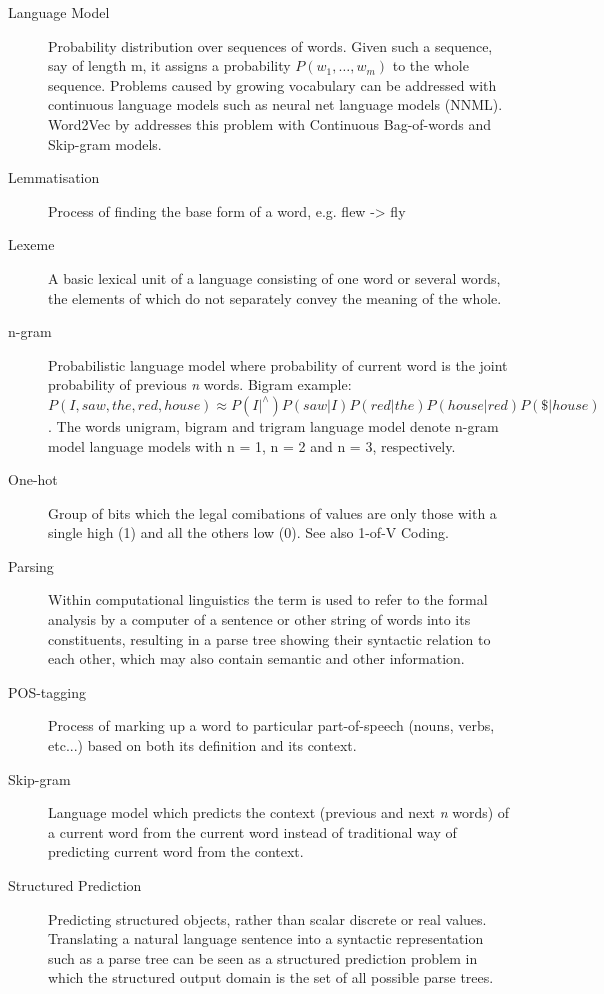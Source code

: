 \documentclass[12pt,a4paper,english
]{tutthesis}
\begin{document}
\begin{description}
\item[Language Model] Probability distribution over sequences of words. Given such a sequence, say of length m, it assigns a probability $P(w_{1},\ldots ,w_{m})$ to the whole sequence. Problems caused by growing vocabulary can be addressed with continuous language models such as neural net language models (NNML). Word2Vec by \cite{Mikolov2013} addresses this problem with Continuous Bag-of-words and Skip-gram models.

\item[Lemmatisation] Process of finding the base form of a word, e.g. flew -> fly

\item[Lexeme] A basic lexical unit of a language consisting of one word or several words, the elements of which do not separately convey the meaning of the whole.

\item[n-gram] Probabilistic language model where probability of current word is the joint probability of previous \textit{n} words. Bigram example: $P(I, saw, the, red, house) \approx P(I | ^\wedge)P(saw | I)P(red | the)P(house | red)P(\$ | house)$. The words unigram, bigram and trigram language model denote n-gram model language models with n = 1, n = 2 and n = 3, respectively.

\item[One-hot] Group of bits which the legal comibations of values are only those with a single high (1) and all the others low (0). See also 1-of-V Coding.

\item[Parsing] Within computational linguistics the term is used to refer to the formal analysis by a computer of a sentence or other string of words into its constituents, resulting in a parse tree showing their syntactic relation to each other, which may also contain semantic and other information.

\item[POS-tagging] Process of marking up a word to particular part-of-speech (nouns, verbs, etc...) based on both its definition and its context.

\item[Skip-gram] Language model which predicts the context (previous and next \textit{n} words) of a current word from the current word instead of traditional way of predicting current word from the context.

\item[Structured Prediction] Predicting structured objects, rather than scalar discrete or real values. Translating a natural language sentence into a syntactic representation such as a parse tree can be seen as a structured prediction problem in which the structured output domain is the set of all possible parse trees.


\end{description}
\end{document}
